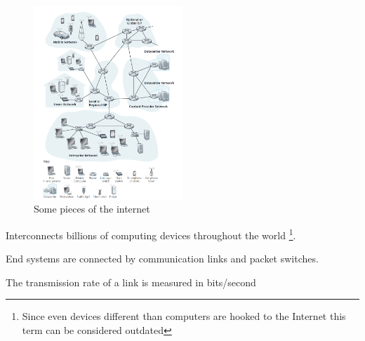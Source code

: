 \begin{figure}[h]
    \caption{Some pieces of the internet}
    \label{fig:some_pieces_of_the_internet_1}
    \centering\includegraphics[width=0.5\textwidth]
    {Figures/lec_1_some_pieces_of_the_internet.png}
\end{figure}

\begin{definition}\label{def:computer_network_1}
    Interconnects billions of computing devices throughout the world
    \footnote{Since even devices different than computers are hooked to 
    the Internet this term can be considered outdated}.    
\end{definition}

\begin{note}\label{note:end_systems_1}
    End systems are connected by communication links and packet switches.
\end{note}

\begin{note}\label{note:transmission_rate_1}
    The transmission rate of a link is measured in bits/second
\end{note}

\vspace{24pt}

